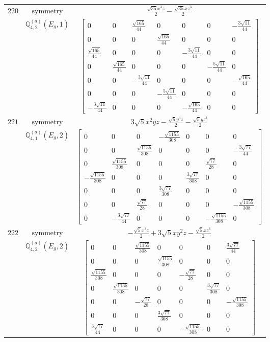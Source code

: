 \documentclass[fleqn,8pt,landscape]{jsarticle}
\begin{document}
\begin{longtable}{ccc}
$ 220 $ & $ \text{symmetry} $ & $ \frac{\sqrt{35} x^{3} z}{2} - \frac{\sqrt{35} x z^{3}}{2} $ \\
$  $ & $ \mathbb{Q}_{4,2}^{(a)}(E_{g},1) $ & $ \begin{bmatrix} 0 & 0 & \frac{\sqrt{165}}{44} & 0 & 0 & 0 & - \frac{3 \sqrt{11}}{44} \\ 0 & 0 & 0 & \frac{\sqrt{165}}{44} & 0 & 0 & 0 \\ \frac{\sqrt{165}}{44} & 0 & 0 & 0 & - \frac{3 \sqrt{11}}{44} & 0 & 0 \\ 0 & \frac{\sqrt{165}}{44} & 0 & 0 & 0 & - \frac{5 \sqrt{11}}{44} & 0 \\ 0 & 0 & - \frac{3 \sqrt{11}}{44} & 0 & 0 & 0 & - \frac{\sqrt{165}}{44} \\ 0 & 0 & 0 & - \frac{5 \sqrt{11}}{44} & 0 & 0 & 0 \\ - \frac{3 \sqrt{11}}{44} & 0 & 0 & 0 & - \frac{\sqrt{165}}{44} & 0 & 0 \end{bmatrix} $ \\ \hline
$ 221 $ & $ \text{symmetry} $ & $ 3 \sqrt{5} x^{2} y z - \frac{\sqrt{5} y^{3} z}{2} - \frac{\sqrt{5} y z^{3}}{2} $ \\
$  $ & $ \mathbb{Q}_{4,1}^{(a)}(E_{g},2) $ & $ \begin{bmatrix} 0 & 0 & 0 & - \frac{\sqrt{1155}}{308} & 0 & 0 & 0 \\ 0 & 0 & \frac{\sqrt{1155}}{308} & 0 & 0 & 0 & - \frac{3 \sqrt{77}}{44} \\ 0 & \frac{\sqrt{1155}}{308} & 0 & 0 & 0 & \frac{\sqrt{77}}{28} & 0 \\ - \frac{\sqrt{1155}}{308} & 0 & 0 & 0 & \frac{3 \sqrt{77}}{308} & 0 & 0 \\ 0 & 0 & 0 & \frac{3 \sqrt{77}}{308} & 0 & 0 & 0 \\ 0 & 0 & \frac{\sqrt{77}}{28} & 0 & 0 & 0 & - \frac{\sqrt{1155}}{308} \\ 0 & - \frac{3 \sqrt{77}}{44} & 0 & 0 & 0 & - \frac{\sqrt{1155}}{308} & 0 \end{bmatrix} $ \\ \hline
$ 222 $ & $ \text{symmetry} $ & $ - \frac{\sqrt{5} x^{3} z}{2} + 3 \sqrt{5} x y^{2} z - \frac{\sqrt{5} x z^{3}}{2} $ \\
$  $ & $ \mathbb{Q}_{4,2}^{(a)}(E_{g},2) $ & $ \begin{bmatrix} 0 & 0 & \frac{\sqrt{1155}}{308} & 0 & 0 & 0 & \frac{3 \sqrt{77}}{44} \\ 0 & 0 & 0 & \frac{\sqrt{1155}}{308} & 0 & 0 & 0 \\ \frac{\sqrt{1155}}{308} & 0 & 0 & 0 & - \frac{\sqrt{77}}{28} & 0 & 0 \\ 0 & \frac{\sqrt{1155}}{308} & 0 & 0 & 0 & \frac{3 \sqrt{77}}{308} & 0 \\ 0 & 0 & - \frac{\sqrt{77}}{28} & 0 & 0 & 0 & - \frac{\sqrt{1155}}{308} \\ 0 & 0 & 0 & \frac{3 \sqrt{77}}{308} & 0 & 0 & 0 \\ \frac{3 \sqrt{77}}{44} & 0 & 0 & 0 & - \frac{\sqrt{1155}}{308} & 0 & 0 \end{bmatrix} $ \\ \hline

\end{longtable}
\end{document}
